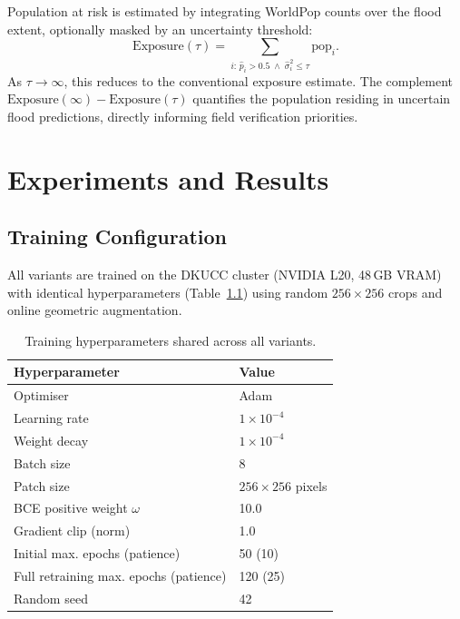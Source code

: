 \documentclass[12pt,oneside]{report}
\begin{document}
Population at risk is estimated by integrating WorldPop counts over the flood
extent, optionally masked by an uncertainty threshold:
\begin{equation}
  \text{Exposure}(\tau) = \sum_{i:\,\hat{p}_i > 0.5 \;\wedge\;
                           \hat{\sigma}^2_i \leq \tau} \mathrm{pop}_i.
  \label{eq:exposure}
\end{equation}
As $\tau \to \infty$, this reduces to the conventional exposure estimate.
The complement $\text{Exposure}(\infty) - \text{Exposure}(\tau)$ quantifies
the population residing in uncertain flood predictions, directly informing
field verification priorities.

\chapter{Experiments and Results}
\label{ch:experiments}

\section{Training Configuration}

All variants are trained on the DKUCC cluster (NVIDIA L20, 48\,GB VRAM) with
identical hyperparameters (Table~\ref{tab:hparams}) using random $256 \times
256$ crops and online geometric augmentation.

\begin{table}[htbp]
\centering
\caption{Training hyperparameters shared across all variants.}
\label{tab:hparams}
\begin{tabular}{ll}
\toprule
\textbf{Hyperparameter} & \textbf{Value} \\
\midrule
Optimiser & Adam \\
Learning rate & $1 \times 10^{-4}$ \\
Weight decay & $1 \times 10^{-4}$ \\
Batch size & 8 \\
Patch size & $256 \times 256$ pixels \\
BCE positive weight $\omega$ & 10.0 \\
Gradient clip (norm) & 1.0 \\
Initial max. epochs (patience) & 50 (10) \\
Full retraining max. epochs (patience) & 120 (25) \\
Random seed & 42 \\
\bottomrule
\end{tabular}
\end{table}
\end{document}
